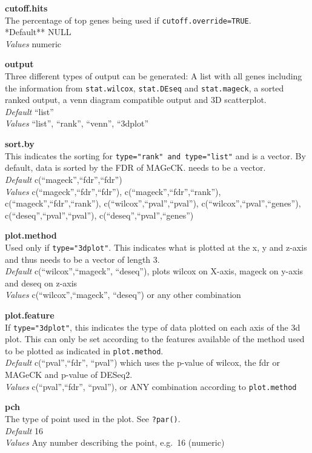 \documentclass[]{article}
\begin{document}
\textbf{cutoff.hits}\\
The percentage of top genes being used if
\texttt{cutoff.override=TRUE}.\\
*Default** NULL\\
\emph{Values} numeric

\textbf{output}\\
Three different types of output can be generated: A list with all genes
including the information from \texttt{stat.wilcox}, \texttt{stat.DEseq}
and \texttt{stat.mageck}, a sorted ranked output, a venn diagram
compatible output and 3D scatterplot.\\
\emph{Default} ``list''\\
\emph{Values} ``list'', ``rank'', ``venn'', ``3dplot''

\textbf{sort.by}\\
This indicates the sorting for \texttt{type="rank"\ and\ type="list"}
and is a vector. By default, data is sorted by the FDR of MAGeCK. needs
to be a vector.\\
\emph{Default} c(``mageck'',``fdr'',``fdr'')\\
\emph{Values} c(``mageck'',``fdr'',``fdr''),
c(``mageck'',``fdr'',``rank''), c(``mageck'',``fdr'',``rank''),
c(``wilcox'',``pval'',``pval''), c(``wilcox'',``pval'',``genes''),
c(``deseq'',``pval'',``pval''), c(``deseq'',``pval'',``genes'')

\textbf{plot.method}\\
Used only if \texttt{type="3dplot"}. This indicates what is plotted at
the x, y and z-axis and thus needs to be a vector of length 3.\\
\emph{Default} c(``wilcox'',``mageck'', ``deseq''), plots wilcox on
X-axis, mageck on y-axis and deseq on z-axis\\
\emph{Values} c(``wilcox'',``mageck'', ``deseq'') or any other
combination

\textbf{plot.feature}\\
If \texttt{type="3dplot"}, this indicates the type of data plotted on
each axis of the 3d plot. This can only be set according to the features
available of the method used to be plotted as indicated in
\texttt{plot.method}.\\
\emph{Default} c(``pval'',``fdr'', ``pval'') which uses the p-value of
wilcox, the fdr or MAGeCK and p-value of DESeq2.\\
\emph{Values} c(``pval'',``fdr'', ``pval''), or ANY combination
according to \texttt{plot.method}

\textbf{pch}\\
The type of point used in the plot. See \texttt{?par()}.\\
\emph{Default} 16\\
\emph{Values} Any number describing the point, e.g.~16 (numeric)
\end{document}
